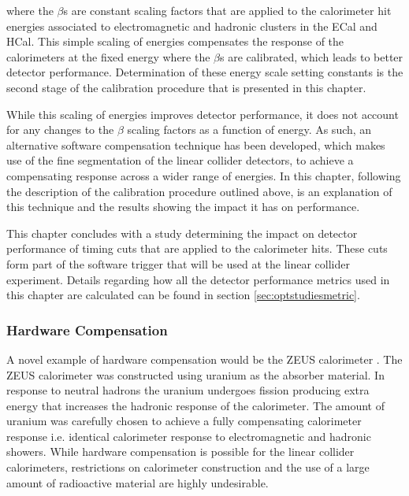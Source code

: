 \noindent where the $\beta$s are constant scaling factors that are applied to the calorimeter hit energies associated to electromagnetic and hadronic clusters in the ECal and HCal.  This simple scaling of energies compensates the response of the calorimeters at the fixed energy where the $\beta$s are calibrated, which leads to better detector performance.  Determination of these energy scale setting constants is the second stage of the calibration procedure that is presented in this chapter.  

While this scaling of energies improves detector performance, it does not account for any changes to the $\beta$ scaling factors as a function of energy.  As such, an alternative software compensation technique has been developed, which makes use of the fine segmentation of the linear collider detectors, to achieve a compensating response across a wider range of energies.  In this chapter, following the description of the calibration procedure outlined above, is an explanation of this technique and the results showing the impact it has on performance.  

This chapter concludes with a study determining the impact on detector performance of timing cuts that are applied to the calorimeter hits.  These cuts form part of the software trigger that will be used at the linear collider experiment.  Details regarding how all the detector performance metrics used in this chapter are calculated can be found in section \ref{sec:optstudiesmetric}.


\subsubsection{Hardware Compensation}
A novel example of hardware compensation would be the ZEUS calorimeter \cite{Derrick:1991tq}.  The ZEUS calorimeter was constructed using uranium as the absorber material.  In response to neutral hadrons the uranium undergoes fission producing extra energy that increases the hadronic response of the calorimeter.  The amount of uranium was carefully chosen to achieve a fully compensating calorimeter response i.e. identical calorimeter response to electromagnetic and hadronic showers.  While hardware compensation is possible for the linear collider calorimeters, restrictions on calorimeter construction and the use of a large amount of radioactive material are highly undesirable.  

